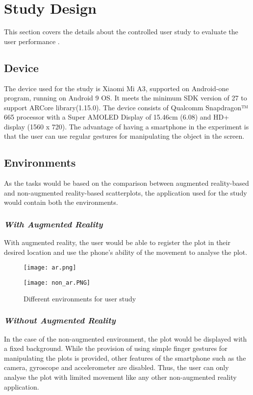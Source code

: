 \documentclass[journal]{vgtc}                %
\begin{document}
\section{Study Design}
This section covers the details about the controlled user study to evaluate the user performance \cite{lam2011empirical}.
\subsection{Device}
The device used for the study is Xiaomi Mi A3, supported on Android-one program, running on Android 9 OS. It meets the minimum SDK version of 27 to support ARCore library(1.15.0). The device consists of Qualcomm\textsuperscript{\textregistered} Snapdragon™ 665 processor with a Super AMOLED Display of 15.46cm (6.08) and HD+ display (1560 x 720). The advantage of having a smartphone in the experiment is that the user can use regular gestures for manipulating the object in the screen.


\subsection{Environments}
As the tasks would be based on the comparison between augmented reality-based and non-augmented reality-based scatterplots, the application used for the study would contain both the environments.
\subsubsection{\textit{With Augmented Reality}}
With augmented reality, the user would be able to register the plot in their desired location and use the phone's ability of the movement to analyse the plot.

\begin{figure}[ht]
    \begin{minipage}[b]{0.45\linewidth}
        \centering
        \texttt{[image: ar.png]}
    \end{minipage}
    \hspace{0.5cm}
    \begin{minipage}[b]{0.45\linewidth}
        \centering
        \texttt{[image: non\_ar.PNG]}
    \end{minipage}
    \caption{Different environments for user study}
\end{figure}

\subsubsection{\textit{Without Augmented Reality}}
In the case of the non-augmented environment, the plot would be displayed with a fixed background. While the provision of using simple finger gestures for manipulating the plots is provided, other features of the smartphone such as the camera, gyroscope and accelerometer are disabled. Thus, the user can only analyse the plot with limited movement like any other non-augmented reality application.
\end{document}

